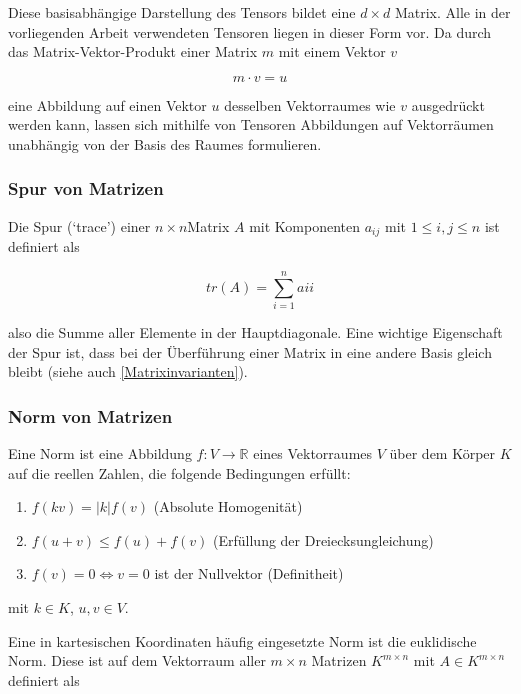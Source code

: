 \documentclass[a4paper,fontsize=12pt,toc=bib,halfparskip]{scrartcl}
\begin{document}
Diese basisabh\"angige Darstellung des Tensors bildet eine $d\times d$ Matrix. Alle in der vorliegenden Arbeit verwendeten Tensoren liegen in dieser Form vor. Da durch das Matrix-Vektor-Produkt einer Matrix $m$ mit einem Vektor $v$

\begin{equation}
	m \cdot v = u
\end{equation} 

eine Abbildung auf einen Vektor $u$ desselben Vektorraumes wie $v$ ausgedr\"uckt werden kann, lassen sich mithilfe von Tensoren Abbildungen auf Vektorr\"aumen unabh\"angig von der Basis des Raumes formulieren.

\subsubsection{Spur von Matrizen}
Die Spur (`trace') einer $n\times n$Matrix $A$ mit Komponenten $a_{ij}$ mit $1 \leq i,j \leq n$ ist definiert als

\begin{equation}
	tr(A) = \sum_{i = 1}^{n} a{ii}
\end{equation}

also die Summe aller Elemente in der Hauptdiagonale. Eine wichtige Eigenschaft der Spur ist, dass bei der \"Uberf\"uhrung einer Matrix in eine andere Basis gleich bleibt (siehe auch \ref{Matrixinvarianten}).


\subsubsection{Norm von Matrizen}
Eine Norm ist eine Abbildung $f: V \rightarrow \mathbb{R}$ eines Vektorraumes $V$ \"uber dem K\"orper $K$ auf die reellen Zahlen, die folgende Bedingungen erf\"ullt:
\begin{enumerate}
	\item $f(kv) = |k|f(v)$ (Absolute Homogenit\"at)
	\item $f(u+v) \leq f(u) + f(v)$ (Erf\"ullung der Dreiecksungleichung)
	\item $f(v) = 0 \iff v=0$ ist der Nullvektor (Definitheit)
\end{enumerate}

mit $k \in K$, $u,v \in V$.


Eine in kartesischen Koordinaten h\"aufig eingesetzte Norm ist die euklidische Norm. Diese ist auf dem Vektorraum aller $m \times n$ Matrizen $K^{m\times n}$ mit $A \in K^{m\times n}$ definiert als
\end{document}
